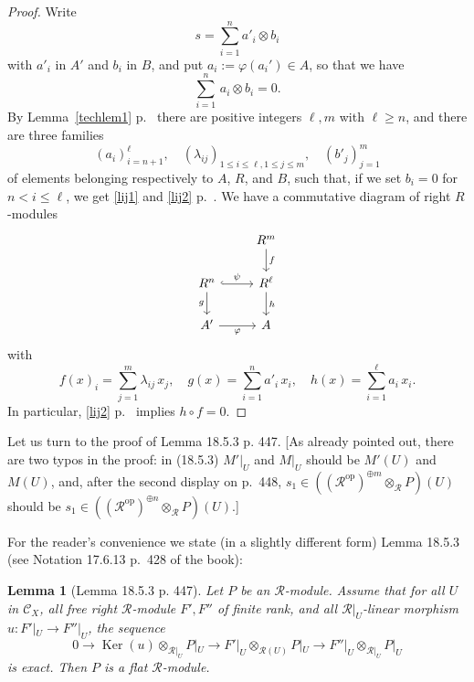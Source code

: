 \documentclass[12pt]{article}
\newtheorem{lem}[thm]{Lemma}
\theoremstyle{remark}
\theoremstyle{definition}
\newcommand{\cc}{\mathcal}
\newcommand{\C}{\mathcal C}
\newcommand{\pp}{\varphi}
\DeclareMathOperator{\Ker}{Ker}
\DeclareMathOperator{\op}{op}
\begin{document}
\begin{proof} 
Write 
$$
s=\sum_{i=1}^na'_i\otimes b_i
$$ 
with $a'_i$ in $A'$ and $b_i$ in $B$, and put $a_i:=\pp(a_i')\in A$, so that we have 
$$
\sum_{i=1}^n\,a_i\otimes b_i=0.
$$ 
By Lemma~\ref{techlem1} p.~\pageref{techlem1} there are positive integers $\ell,m$ with $\ell\ge n$, and there are three families 
$$
(a_i)_{i=n+1}^\ell,\quad(\lambda_{ij})_{1\le i\le\ell,1\le j\le m},\quad(b'_j)_{j=1}^m
$$ 
of elements belonging respectively to $A$, $R$, and $B$, such that, if we set $b_i=0$ for $n<i\le\ell$, we get \eqref{lij1} and \eqref{lij2} p.~\pageref{lij1}. We have a commutative diagram of right $R$-modules 
%
\begin{equation}\label{d447}
\begin{tikzcd}
{}&R^m\ar{d}{f}\\ 
R^n\ar[hook]{r}{\psi}\ar{d}[swap]{g}&R^\ell\ar{d}{h}\\ 
A'\ar{r}[swap]{\pp}&A
\end{tikzcd}
\end{equation}
%
with 
$$
f(x)_i=\sum_{j=1}^m\lambda_{ij}\,x_j,\quad g(x)=\sum_{i=1}^na'_i\,x_i,\quad h(x)=\sum_{i=1}^\ell a_i\,x_i.
$$ 
In particular, \eqref{lij2} p.~\pageref{lij2} implies $h\circ f=0$. 
\end{proof} 

Let us turn to the proof of Lemma 18.5.3 p. 447. [As already pointed out, there are two typos in the proof: in (18.5.3) $M'|_U$ and $M|_U$ should be $M'(U)$ and $M(U)$, and, after the second display on p.~448, $s_1\in((\cc R^{\op})^{\oplus m}\otimes_{\cc R}P)(U)$ should be $s_1\in((\cc R^{\op})^{\oplus n}\otimes_{\cc R}P)(U)$.] 

For the reader's convenience we state (in a slightly different form) Lemma 18.5.3 (see Notation 17.6.13 p.~428 of the book): 

\begin{lem}[Lemma 18.5.3 p. 447]\label{l1853}
Let $P$ be an $\cc R$-module. Assume that for all $U$ in $\C_X$, all free right $\cc R$-module $F',F''$ of finite rank, and all $\cc R|_U$-linear morphism $u:F'|_U\to F''|_U$, the sequence 
$$
0\to\Ker(u)\otimes_{\cc R|_U}P|_U\to F'|_U\otimes_{\cc R(U)}P|_U\to F''|_U\otimes_{\cc R|_U}P|_U
$$ 
is exact. Then $P$ is a flat $\cc R$-module.
\end{lem} 
\end{document}
